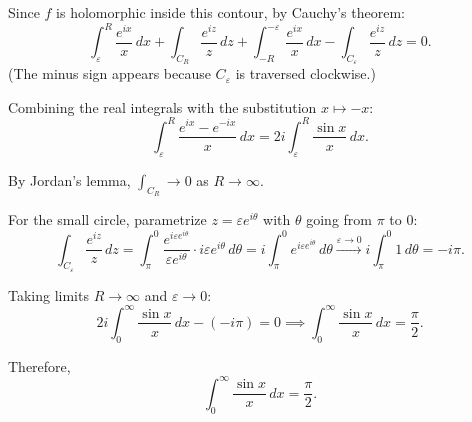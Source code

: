 \begin{example}
  Since $f$ is holomorphic inside this contour, by Cauchy's theorem:
  \[
    \int_{\varepsilon}^{R} \frac{e^{ix}}{x} \, dx + \int_{C_R} \frac{e^{iz}}{z} \, dz + \int_{-R}^{-\varepsilon} \frac{e^{ix}}{x} \, dx - \int_{C_\varepsilon} \frac{e^{iz}}{z} \, dz = 0.
  \]
  (The minus sign appears because $C_\varepsilon$ is traversed clockwise.)

  Combining the real integrals with the substitution $x \mapsto -x$:
  \[
    \int_{\varepsilon}^{R} \frac{e^{ix} - e^{-ix}}{x} \, dx = 2i \int_{\varepsilon}^{R} \frac{\sin x}{x} \, dx.
  \]

  By Jordan's lemma, $\int_{C_R} \to 0$ as $R \to \infty$.

  For the small circle, parametrize $z = \varepsilon e^{i\theta}$ with $\theta$ going from $\pi$ to $0$:
  \[
    \int_{C_\varepsilon} \frac{e^{iz}}{z} \, dz = \int_{\pi}^{0} \frac{e^{i\varepsilon e^{i\theta}}}{\varepsilon e^{i\theta}} \cdot i\varepsilon e^{i\theta} \, d\theta = i \int_{\pi}^{0} e^{i\varepsilon e^{i\theta}} \, d\theta \xrightarrow{\varepsilon \to 0} i \int_{\pi}^{0} 1 \, d\theta = -i\pi.
  \]

  Taking limits $R \to \infty$ and $\varepsilon \to 0$:
  \[
    2i \int_0^{\infty} \frac{\sin x}{x} \, dx - (-i\pi) = 0 \implies \int_0^{\infty} \frac{\sin x}{x} \, dx = \frac{\pi}{2}.
  \]

  Therefore,
  \[
    \boxed{\int_0^{\infty} \frac{\sin x}{x} \, dx = \frac{\pi}{2}.}
  \]
\end{example}

